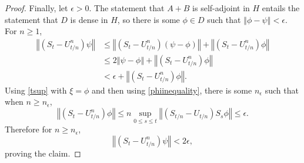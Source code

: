 \documentclass{article}
\newcommand{\norm}[1]{\left\Vert #1 \right\Vert}
\theoremstyle{definition}
\begin{document}
\begin{proof}
Finally, let $\epsilon>0$. The statement that $A+B$ is self-adjoint in $H$ entails the statement that $D$ is dense in $H$,
so there is some $\phi \in D$ such that $\norm{\phi-\psi}<\epsilon$. 
For $n \geq 1$,
\begin{align*}
\norm{(S_t-U_{t/n}^n) \psi}&\leq \norm{(S_t-U_{t/n}^n) (\psi-\phi)}
+\norm{(S_t-U_{t/n}^n) \phi}\\
&\leq 2 \norm{\psi-\phi}
+\norm{(S_t-U_{t/n}^n) \phi}\\
&<\epsilon+\norm{(S_t-U_{t/n}^n) \phi}.
\end{align*}
Using
 \eqref{tsup} with $\xi=\phi$ and then using \eqref{phiinequality}, there is some $n_\epsilon$ such that
 when $n \geq n_\epsilon$,
\[
\norm{(S_t-U_{t/n}^n)\phi} \leq n\sup_{0 \leq s \leq t} \norm{(S_{t/n}-U_{t/n})S_s \phi} \leq \epsilon.
\]
Therefore for $n \geq n_\epsilon$,
\[
\norm{(S_t-U_{t/n}^n) \psi} < 2\epsilon,
\]
proving the claim.
\end{proof}
\end{document}

